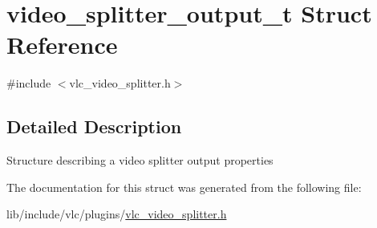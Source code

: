 \hypertarget{structvideo__splitter__output__t}{}\section{video\+\_\+splitter\+\_\+output\+\_\+t Struct Reference}
\label{structvideo__splitter__output__t}


{\ttfamily \#include $<$vlc\+\_\+video\+\_\+splitter.\+h$>$}



\subsection{Detailed Description}
Structure describing a video splitter output properties 

The documentation for this struct was generated from the following file\+:\begin{DoxyCompactItemize}
\item 
lib/include/vlc/plugins/\hyperlink{vlc__video__splitter_8h}{vlc\+\_\+video\+\_\+splitter.\+h}\end{DoxyCompactItemize}
